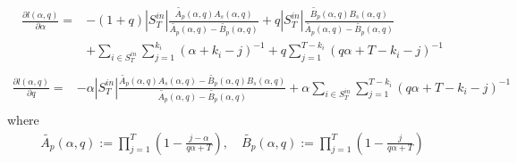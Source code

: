 \documentclass[a4paper, 12pt]{article}
\newcommand{\sint}[1][T]{|S^{in}_{#1}|}
\begin{document}
\begin{align*}
    \frac{\partial l(\alpha, q)}{\partial \alpha} = &-(1 + q)\sint \frac{ \widetilde{A_p}(\alpha, q) A_s(\alpha, q) }{\widetilde{A_p}(\alpha, q) - \widetilde{B_p}(\alpha, q)} + q|S_T^{in}| \frac{\widetilde{B_p}(\alpha, q) B_s(\alpha, q)  }{ \widetilde{A_p}(\alpha, q) - \widetilde{B_p}(\alpha, q)} \\
    &+ \sum_{i \in S_T^{in}} \sum_{j = 1}^{k_i} (\alpha + k_i - j)^{-1} + q\sum_{j = 1}^{T - k_i} (q\alpha + T - k_i - j)^{-1} \\
\end{align*}
\begin{align*}
    \frac{\partial l(\alpha, q)}{\partial q} =& -\alpha \sint \frac{ \widetilde{A_p}(\alpha, q) A_s(\alpha, q) - \widetilde{B_p}(\alpha, q) B_s(\alpha, q)  }{ \widetilde{A_p}(\alpha, q) - \widetilde{B_p}(\alpha, q)} + \alpha \sum_{i \in S_T^{in}} \sum_{j = 1}^{T - k_i} (q\alpha + T - k_i - j)^{-1} \\
\end{align*}
where
\begin{align*}
\widetilde{A_p}(\alpha, q) := \prod_{j = 1}^{T} \left(1 - \frac{j - \alpha}{q\alpha + T}\right)  ,\quad \widetilde{B_p}(\alpha, q) := \prod_{j = 1}^{T} \left(1 - \frac{j}{q\alpha + T}\right) \\
\end{align*}
\end{document}
